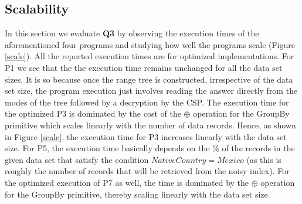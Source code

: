 \subsection*{Scalability}
 In this section we evaluate \textbf{Q3} by observing the execution times of the aforementioned four \system programs and studying how well the programs scale (Figure \ref{scale}). All the reported execution times are for optimized implementations. For P1 we see that the the execution time remains unchanged for all the data set sizes. It is so because once the range tree is constructed, irrespective of the data set size, the program execution just involves reading the answer directly from the modes of the tree followed by a decryption by the \textsf{CSP}. The execution time for the optimized P3 is dominated by the cost of the $\oplus$ operation for the \textsf{GroupBy} primitive which scales linearly with the number of data records. Hence, as shown in Figure \ref{scale}, the execution time for P3 increases linearly with the data set size. For P5, the execution time basically depends on the \% of the records in the given data set that satisfy the condition $NativeCountry=Mexico$ (as this is roughly the number of records that will be retrieved from the noisy index). %
 For the optimized execution of P7  as well, the time is dominated by the $\oplus$ operation for the \textsf{GroupBy} primitive, thereby scaling linearly with the data set size.   %
